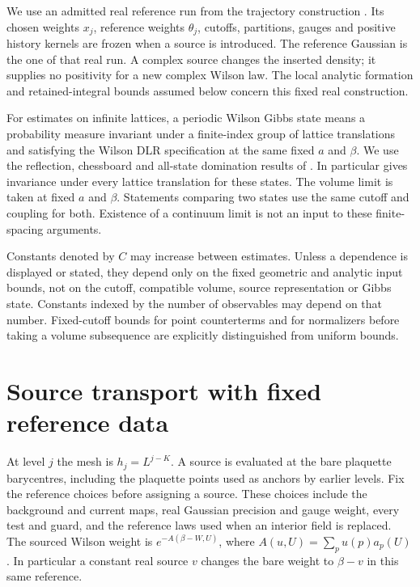 \documentclass[11pt,letterpaper,reqno]{amsart}
\numberwithin{equation}{section}
\theoremstyle{definition}
\theoremstyle{remark}
\begin{document}
We use an admitted real reference run from the trajectory
construction \cite{RT}. Its chosen weights $x_j$, reference
weights $\theta_j$, cutoffs, partitions, gauges and positive history
kernels are frozen when a source is introduced. The reference
Gaussian is the one of that real run. A complex source changes the
inserted density; it supplies no positivity for a new complex
Wilson law. The local analytic formation and retained-integral
bounds assumed below concern this fixed real construction.

For estimates on infinite lattices, a periodic Wilson Gibbs state
means a probability measure invariant under a finite-index group
of lattice translations and satisfying the Wilson DLR
specification at the same fixed $a$ and $\beta$. We use the
reflection, chessboard and all-state domination results of
\cite{LP}. In particular \cite[Theorem~B]{LP} gives invariance
under every lattice translation for these states. The volume
limit is taken at fixed $a$ and $\beta$.
Statements comparing two states use the same cutoff and coupling
for both. Existence of a continuum limit is not an input to these
finite-spacing arguments.

Constants denoted by $C$ may increase between estimates. Unless a
dependence is displayed or stated, they depend only on the fixed
geometric and analytic input bounds, not on the cutoff, compatible
volume, source representation or Gibbs state. Constants indexed by
the number of observables may depend on that number. Fixed-cutoff
bounds for point counterterms and for normalizers before taking a
volume subsequence are explicitly distinguished from uniform bounds.


\section{Source transport with fixed reference data}\label{si:sec-frozen-transport}

At level $j$ the mesh is $h_j=L^{j-K}$. A source is evaluated at the
bare plaquette barycentres, including the plaquette points used as
anchors by earlier levels. Fix the reference choices before assigning
a source. These choices include the background and current maps, real
Gaussian precision and gauge weight, every test and guard, and the
reference laws used when an interior field is replaced. The sourced
Wilson weight is $e^{-A(\beta-W,U)}$, where
$A(u,U)=\sum_p u(p)a_p(U)$. In particular a constant real source $v$
changes the bare weight to $\beta-v$ in this same reference.
\end{document}

